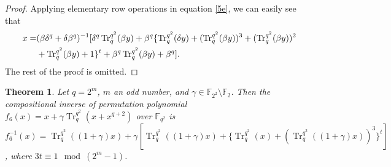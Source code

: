\documentclass{birkjour}
\newtheorem{thm}{Theorem}[section]
\theoremstyle{definition}
\theoremstyle{remark}
\numberwithin{equation}{section}
\begin{document}
\begin{proof}
 Applying elementary row operations in equation \ref{5e}, we can easily see that
	\begin{align}
		x=&(\beta\delta^q+\delta\beta^q)^{-1}[\delta^q	\operatorname{Tr}_{q}^{q^2}(\beta y)+\beta^q\{\operatorname{Tr}_q^{q^2}(\delta y)+(\operatorname{Tr}_q^{q^2}(\beta y))^3+(\operatorname{Tr}_q^{q^2}(\beta y))^2\notag\\&+\operatorname{Tr}_q^{q^2}(\beta y)+1\}^t+\beta^q\operatorname{Tr}_q^{q^2}(\beta y)+\beta^q].\label{5e}
	\end{align}
The rest of the proof is omitted.
\end{proof}

\begin{thm}Let $q=2^m$, $m$ an odd number, and $\gamma\in \mathbb{F}_{2^2}\setminus\mathbb{F}_2$. Then the compositional inverse of permutation polynomial 
	$f_6(x)=x+\gamma\operatorname{Tr}_{q}^{q^2}(x+x^{q+2})$ over $\mathbb{F}_{q^2}$ is
	$f_6^{-1}(x)=\operatorname{Tr}_q^{q^2}((1+\gamma)x)+\gamma[\operatorname{Tr}_q^{q^2}((1+\gamma)x)+\{\operatorname{Tr}_q^{q^2}(x)+(\operatorname{Tr}_q^{q^2}((1+\gamma)x))^3\}^t]$, where $3t\equiv 1\mod{(2^m-1)}$.
\end{thm}
\end{document}
